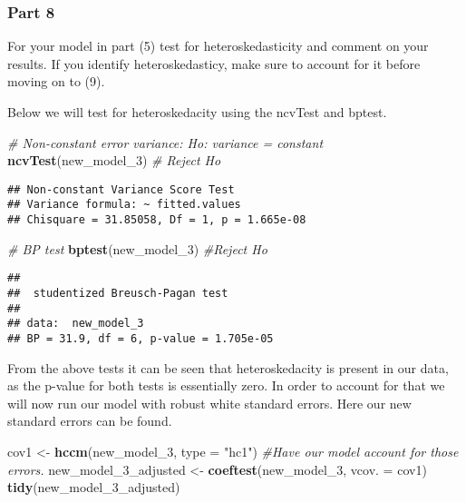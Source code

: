 \documentclass[
]{article}
\newenvironment{Shaded}{\begin{snugshade}}{\end{snugshade}}
\newcommand{\CommentTok}[1]{\textcolor[rgb]{0.56,0.35,0.01}{\textit{#1}}}
\newcommand{\DataTypeTok}[1]{\textcolor[rgb]{0.13,0.29,0.53}{#1}}
\newcommand{\DecValTok}[1]{\textcolor[rgb]{0.00,0.00,0.81}{#1}}
\newcommand{\KeywordTok}[1]{\textcolor[rgb]{0.13,0.29,0.53}{\textbf{#1}}}
\newcommand{\NormalTok}[1]{#1}
\newcommand{\StringTok}[1]{\textcolor[rgb]{0.31,0.60,0.02}{#1}}
\begin{document}
\hypertarget{part-8}{%
\subsubsection{Part 8}\label{part-8}}

For your model in part (5) test for heteroskedasticity and comment on
your results. If you identify heteroskedasticy, make sure to account for
it before moving on to (9).

Below we will test for heteroskedacity using the ncvTest and bptest.

\begin{Shaded}
\begin{Highlighting}[]
\CommentTok{# Non-constant error variance: Ho: variance = constant }
\KeywordTok{ncvTest}\NormalTok{(new_model_}\DecValTok{3}\NormalTok{) }\CommentTok{# Reject Ho}
\end{Highlighting}
\end{Shaded}

\begin{verbatim}
## Non-constant Variance Score Test 
## Variance formula: ~ fitted.values 
## Chisquare = 31.85058, Df = 1, p = 1.665e-08
\end{verbatim}

\begin{Shaded}
\begin{Highlighting}[]
\CommentTok{# BP test }
\KeywordTok{bptest}\NormalTok{(new_model_}\DecValTok{3}\NormalTok{) }\CommentTok{#Reject Ho}
\end{Highlighting}
\end{Shaded}

\begin{verbatim}
## 
##  studentized Breusch-Pagan test
## 
## data:  new_model_3
## BP = 31.9, df = 6, p-value = 1.705e-05
\end{verbatim}

From the above tests it can be seen that heteroskedacity is present in
our data, as the p-value for both tests is essentially zero. In order to
account for that we will now run our model with robust white standard
errors. Here our new standard errors can be found.

\begin{Shaded}
\begin{Highlighting}[]
\NormalTok{cov1 <-}\StringTok{ }\KeywordTok{hccm}\NormalTok{(new_model_}\DecValTok{3}\NormalTok{, }\DataTypeTok{type =} \StringTok{"hc1"}\NormalTok{)}
\CommentTok{#Have our model account for those errors. }
\NormalTok{new_model_}\DecValTok{3}\NormalTok{_adjusted <-}\StringTok{ }\KeywordTok{coeftest}\NormalTok{(new_model_}\DecValTok{3}\NormalTok{, }\DataTypeTok{vcov. =}\NormalTok{ cov1)}
\KeywordTok{tidy}\NormalTok{(new_model_}\DecValTok{3}\NormalTok{_adjusted)}
\end{Highlighting}
\end{Shaded}
\end{document}
